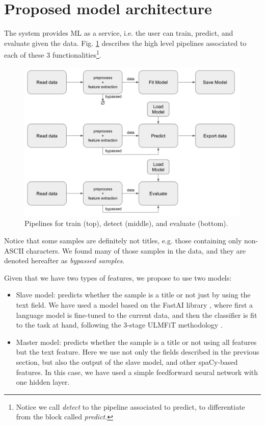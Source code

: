 \documentclass[11pt, oneside]{article}   	%
\begin{document}
\section{Proposed model architecture}

The system provides ML as a service, i.e. the user can train, predict, and evaluate given the data. Fig. \ref{fig:pipelines} describes the high level pipelines associated to each of these 3 functionalities\footnote{Notice we call \textit{detect} to the pipeline associated to predict, to differentiate from the block called \textit{predict}.}. 

\begin{figure}[h!]
\centerline{\includegraphics[width=0.8\linewidth]{pipelines.png}} 
\caption{Pipelines for train (top), detect (middle), and evaluate (bottom).}
\label{fig:pipelines}
\end{figure}

Notice that some samples are definitely not titles, e.g. those containing only non-ASCII characters. We found many of those samples in the data, and they are denoted hereafter as \textit{bypassed samples}. 

Given that we have two types of features, we propose to use two models:
\begin{itemize}
\item Slave model: predicts whether the sample is a title or not just by using the text field. We have used a model based on the FastAI library \cite{FastAI}, where first a language model is fine-tuned to the current data, and then the classifier is fit to the task at hand, following the 3-stage ULMFiT methodology \cite{ULMFiT}.
\item Master model: predicts whether the sample is a title or not using all features but the text feature. Here we use not only the fields described in the previous section, but also the output of the slave model, and other spaCy-based features. In this case, we have used a simple feedforward neural network with one hidden layer.
\end{itemize}
\end{document}
